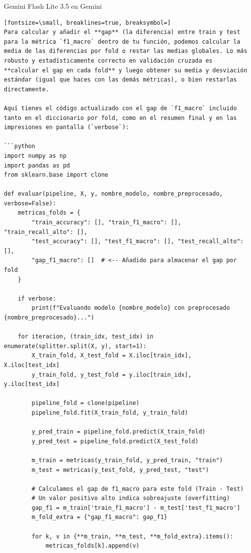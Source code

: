 \documentclass[12pt,a4paper,oneside]{book}
\begin{document}
\begin{iaresp}{Gemini Flash Lite 3.5 en Gemini}
\begin{Verbatim}[fontsize=\small, breaklines=true, breaksymbol=]
Para calcular y añadir el **gap** (la diferencia) entre train y test para la métrica `f1_macro` dentro de tu función, podemos calcular la media de las diferencias por fold o restar las medias globales. Lo más robusto y estadísticamente correcto en validación cruzada es **calcular el gap en cada fold** y luego obtener su media y desviación estándar (igual que haces con las demás métricas), o bien restarlas directamente.

Aquí tienes el código actualizado con el gap de `f1_macro` incluido tanto en el diccionario por fold, como en el resumen final y en las impresiones en pantalla (`verbose`):

```python
import numpy as np
import pandas as pd
from sklearn.base import clone

def evaluar(pipeline, X, y, nombre_modelo, nombre_preprocesado, verbose=False):
    metricas_folds = {
        "train_accuracy": [], "train_f1_macro": [], "train_recall_alto": [],
        "test_accuracy": [], "test_f1_macro": [], "test_recall_alto": [],
        "gap_f1_macro": []  # <-- Añadido para almacenar el gap por fold
    }
    
    if verbose:
        print(f"Evaluando modelo {nombre_modelo} con preprocesado {nombre_preprocesado}...")
        
    for iteracion, (train_idx, test_idx) in enumerate(splitter.split(X, y), start=1):
        X_train_fold, X_test_fold = X.iloc[train_idx], X.iloc[test_idx]
        y_train_fold, y_test_fold = y.iloc[train_idx], y.iloc[test_idx]
        
        pipeline_fold = clone(pipeline)
        pipeline_fold.fit(X_train_fold, y_train_fold)
        
        y_pred_train = pipeline_fold.predict(X_train_fold)
        y_pred_test = pipeline_fold.predict(X_test_fold)
        
        m_train = metricas(y_train_fold, y_pred_train, "train")
        m_test = metricas(y_test_fold, y_pred_test, "test")
        
        # Calculamos el gap de f1_macro para este fold (Train - Test)
        # Un valor positivo alto indica sobreajuste (overfitting)
        gap_f1 = m_train['train_f1_macro'] - m_test['test_f1_macro']
        m_fold_extra = {"gap_f1_macro": gap_f1}
        
        for k, v in {**m_train, **m_test, **m_fold_extra}.items():
            metricas_folds[k].append(v)
            

\end{Verbatim}
\end{iaresp}
\end{document}
